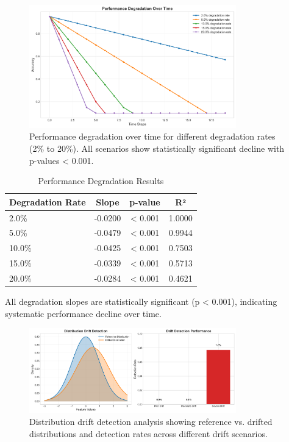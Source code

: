 \documentclass{article}
\begin{document}
\begin{figure}[h]
\centering
\includegraphics[width=0.8\textwidth]{media/degradation_plot.png}
\caption{Performance degradation over time for different degradation rates (2\% to 20\%). All scenarios show statistically significant decline with p-values < 0.001.}
\label{fig:degradation}
\end{figure}

\begin{table}[h]
\centering
\caption{Performance Degradation Results}
\begin{tabular}{lccc}
\toprule
\textbf{Degradation Rate} & \textbf{Slope} & \textbf{p-value} & \textbf{R²} \\
\midrule
2.0\% & -0.0200 & < 0.001 & 1.0000 \\
5.0\% & -0.0479 & < 0.001 & 0.9944 \\
10.0\% & -0.0425 & < 0.001 & 0.7503 \\
15.0\% & -0.0339 & < 0.001 & 0.5713 \\
20.0\% & -0.0284 & < 0.001 & 0.4621 \\
\bottomrule
\end{tabular}
\end{table}

All degradation slopes are statistically significant (p < 0.001), indicating systematic performance decline over time.

\begin{figure}[h]
\centering
\includegraphics[width=0.8\textwidth]{media/drift_detection.png}
\caption{Distribution drift detection analysis showing reference vs. drifted distributions and detection rates across different drift scenarios.}
\label{fig:drift_detection}
\end{figure}
\end{document}
